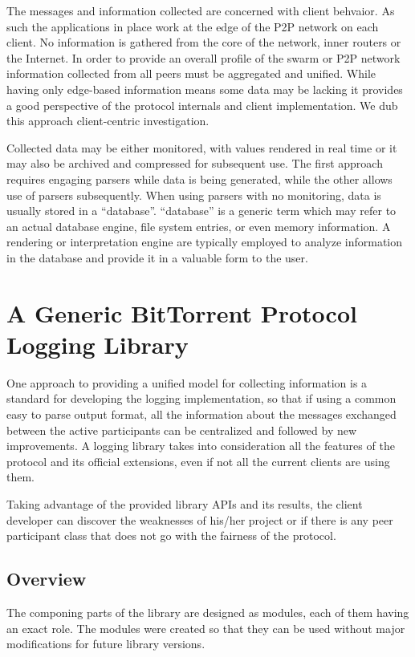 The messages and information collected are concerned with client behvaior. As
such the applications in place work at the edge of the P2P network on each
client. No information is gathered from the core of the network, inner routers
or the Internet. In order to provide an overall profile of the swarm or P2P
network information collected from all peers must be aggregated and unified.
While having only edge-based information means some data may be lacking it
provides a good perspective of the protocol internals and client
implementation. We dub this approach client-centric investigation.

Collected data may be either monitored, with values rendered in real time or
it may also be archived and compressed for subsequent use. The first approach
requires engaging parsers while data is being generated, while the other
allows use of parsers subsequently. When using parsers with no monitoring,
data is usually stored in a ``database''. ``database'' is a generic term which
may refer to an actual database engine, file system entries, or even memory
information. A rendering or interpretation engine are typically employed to
analyze information in the database and provide it in a valuable form to the
user.

\section{A Generic BitTorrent Protocol Logging Library}
\label{sec:proto-measure:log-library}

One approach to providing a unified model for collecting information is a
standard for developing the logging implementation, so that if using a common
easy to parse output format, all the information about the messages exchanged
between the active participants can be centralized and followed by new
improvements. A logging library takes into consideration all the features of
the protocol and its official extensions, even if not all the current clients
are using them.

Taking advantage of the provided library APIs and its results, the client
developer can discover the weaknesses of his/her project or if there is any
peer participant class that does not go with the fairness of the protocol.

\subsection{Overview}

The componing parts of the library are designed as modules, each of them
having an exact role. The modules were created so that they can be used
without major modifications for future library versions.


